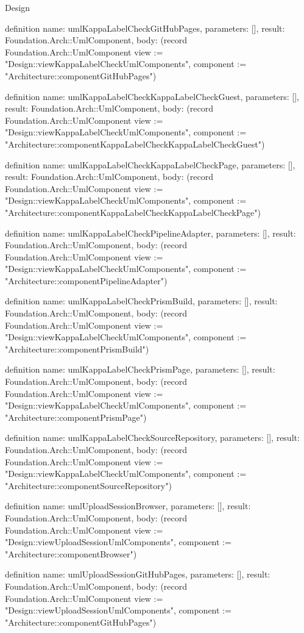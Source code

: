 \begin{lexlean}{Design}
\begin{semanticmodule}
definition{
  name: umlKappaLabelCheckGitHubPages,
  parameters: [],
  result: Foundation.Arch::UmlComponent,
  body: (record Foundation.Arch::UmlComponent {view := "Design::viewKappaLabelCheckUmlComponents", component := "Architecture::componentGitHubPages"})
}

definition{
  name: umlKappaLabelCheckKappaLabelCheckGuest,
  parameters: [],
  result: Foundation.Arch::UmlComponent,
  body: (record Foundation.Arch::UmlComponent {view := "Design::viewKappaLabelCheckUmlComponents", component := "Architecture::componentKappaLabelCheckKappaLabelCheckGuest"})
}

definition{
  name: umlKappaLabelCheckKappaLabelCheckPage,
  parameters: [],
  result: Foundation.Arch::UmlComponent,
  body: (record Foundation.Arch::UmlComponent {view := "Design::viewKappaLabelCheckUmlComponents", component := "Architecture::componentKappaLabelCheckKappaLabelCheckPage"})
}

definition{
  name: umlKappaLabelCheckPipelineAdapter,
  parameters: [],
  result: Foundation.Arch::UmlComponent,
  body: (record Foundation.Arch::UmlComponent {view := "Design::viewKappaLabelCheckUmlComponents", component := "Architecture::componentPipelineAdapter"})
}

definition{
  name: umlKappaLabelCheckPrismBuild,
  parameters: [],
  result: Foundation.Arch::UmlComponent,
  body: (record Foundation.Arch::UmlComponent {view := "Design::viewKappaLabelCheckUmlComponents", component := "Architecture::componentPrismBuild"})
}

definition{
  name: umlKappaLabelCheckPrismPage,
  parameters: [],
  result: Foundation.Arch::UmlComponent,
  body: (record Foundation.Arch::UmlComponent {view := "Design::viewKappaLabelCheckUmlComponents", component := "Architecture::componentPrismPage"})
}

definition{
  name: umlKappaLabelCheckSourceRepository,
  parameters: [],
  result: Foundation.Arch::UmlComponent,
  body: (record Foundation.Arch::UmlComponent {view := "Design::viewKappaLabelCheckUmlComponents", component := "Architecture::componentSourceRepository"})
}

definition{
  name: umlUploadSessionBrowser,
  parameters: [],
  result: Foundation.Arch::UmlComponent,
  body: (record Foundation.Arch::UmlComponent {view := "Design::viewUploadSessionUmlComponents", component := "Architecture::componentBrowser"})
}

definition{
  name: umlUploadSessionGitHubPages,
  parameters: [],
  result: Foundation.Arch::UmlComponent,
  body: (record Foundation.Arch::UmlComponent {view := "Design::viewUploadSessionUmlComponents", component := "Architecture::componentGitHubPages"})
}


\end{semanticmodule}
\end{lexlean}
